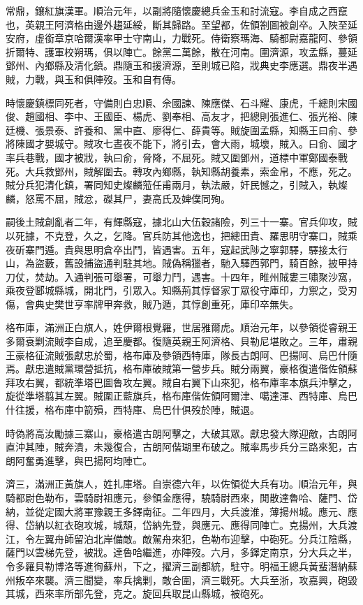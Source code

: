 \begin{pinyinscope}
常鼎，鑲紅旗漢軍。順治元年，以副將隨懷慶總兵金玉和討流寇。李自成之西竄也，英親王阿濟格由邊外趨延綏，斷其歸路。至望都，佐領劄圖被創卒。入陜至延安府，虛銜章京哈爾漢率甲士守南山，力戰死。侍衛察瑪海、騎都尉嘉龍阿、參領折爾特、護軍校朔瑪，俱以陣亡。餘黨二萬餘，散在河南。圍濟源，攻孟縣，蔓延鄧州、內鄉縣及清化鎮。鼎隨玉和援濟源，至則城已陷，戕典史李應選。鼎夜半遇賊，力戰，與玉和俱陣歿。玉和自有傳。

時懷慶鎮標同死者，守備則白忠順、佘國諫、陳應傑、石斗耀、康虎，千總則宋國俊、趙國相、李中、王國臣、楊虎、劉奉相、高友才，把總則張進仁、張光裕、陳廷機、張景泰、許養和、黨中直、廖得仁、薛貴等。賊旋圍孟縣，知縣王曰俞、參將陳國才嬰城守。賊攻七晝夜不能下，將引去，會大雨，城壞，賊入。曰俞、國才率兵巷戰，國才被戕，執曰俞，脅降，不屈死。賊又圍鄧州，道標中軍鄭國泰戰死。大兵救鄧州，賊解圍去。轉攻內鄉縣，執知縣胡養素，索金帛，不應，死之。賊分兵犯清化鎮，署同知史燦麟蒞任甫兩月，執法嚴，奸民憾之，引賊入，執燦麟，怒罵不屈，賊忿，磔其尸，妻高氏及婢僕同殉。

嗣後土賊創亂者二年，有輝縣寇，據北山大伍穀諸險，列三十一寨。官兵仰攻，賊以死據，不克登，久之，乞降。官兵防其他逸也，把總田貴、羅思明守寨口，賊乘夜斫寨門遁。貴與思明倉卒出鬥，皆遇害。五年，寇起武陟之寧郭驛，驛接太行山，為盜藪，舊設捕盜通判駐其地。賊偽稱獵者，馳入驛西郭門，騎百餘，披甲持刀仗，焚劫。入通判張可舉署，可舉力鬥，遇害。十四年，睢州賊婁三嘯聚沙窩，乘夜登郾城縣城，開北門，引眾入。知縣荊其惇督家丁眾役守庫印，力禦之，受刃傷，會典史樊世亨率牌甲奔救，賊乃遁，其惇創重死，庫印卒無失。

格布庫，滿洲正白旗人，姓伊爾根覺羅，世居雅爾虎。順治元年，以參領從睿親王多爾袞剿流賊李自成，追至慶都。復隨英親王阿濟格、貝勒尼堪敗之。三年，肅親王豪格征流賊張獻忠於蜀，格布庫及參領西特庫，隊長古朗阿、巴揚阿、烏巴什隨焉。獻忠遣賊黨環營抵抗，格布庫破賊第一營步兵。賊分兩翼，豪格復遣偕佐領蘇拜攻右翼，都統準塔巴圖魯攻左翼。賊自右翼下山來犯，格布庫率本旗兵沖擊之，旋從準塔翦其左翼。賊圍正藍旗兵，格布庫偕佐領阿爾津、噶達渾、西特庫、烏巴什往援，格布庫中箭殞，西特庫、烏巴什俱歿於陣，賊退。

時偽將高汝勵據三寨山，豪格遣古朗阿擊之，大破其眾。獻忠發大隊迎敵，古朗阿直沖其陣，賊奔潰，未幾復合，古朗阿偕瑚里布破之。賊率馬步兵分三路來犯，古朗阿奮勇進擊，與巴揚阿均陣亡。

濟三，滿洲正黃旗人，姓扎庫塔。自崇德六年，以佐領從大兵有功。順治元年，與騎都尉色勒布，雲騎尉祖應元，參領金應得，驍騎尉西來，閒散達魯哈、薩門、岱納，並從定國大將軍豫親王多鐸南征。二年四月，大兵渡淮，薄揚州城。應元、應得、岱納以紅衣砲攻城，城頹，岱納先登，與應元、應得同陣亡。克揚州，大兵渡江，令左翼舟師留泊北岸備敵。敵駕舟來犯，色勒布迎擊，中砲死。分兵江陰縣，薩門以雲梯先登，被戕。達魯哈繼進，亦陣歿。六月，多鐸定南京，分大兵之半，令多羅貝勒博洛等進徇蘇州，下之，擢濟三副都統，駐守。明福王總兵黃蜚潛納蘇州叛卒來襲。濟三聞變，率兵擒剿，敵合圍，濟三戰死。大兵至浙，攻嘉興，砲毀其城，西來率所部先登，克之。旋回兵取昆山縣城，被砲死。


\end{pinyinscope}
